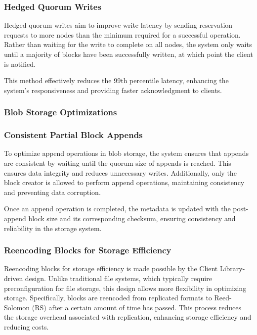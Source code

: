 \subsubsection*{Hedged Quorum Writes}

Hedged quorum writes aim to improve write latency by sending reservation requests to more nodes than the minimum required for a successful operation. Rather than waiting for the write to complete on all nodes, the system only waits until a majority of blocks have been successfully written, at which point the client is notified. 

This method effectively reduces the 99th percentile latency, enhancing the system's responsiveness and providing faster acknowledgment to clients.

\subsubsection{Blob Storage Optimizations}\label{sec:blob_storage_optimization}

\subsubsection*{Consistent Partial Block Appends}

To optimize append operations in blob storage, the system ensures that appends are consistent by waiting until the quorum size of appends is reached. This ensures data integrity and reduces unnecessary writes. Additionally, only the block creator is allowed to perform append operations, maintaining consistency and preventing data corruption.

Once an append operation is completed, the metadata is updated with the post-append block size and its corresponding checksum, ensuring consistency and reliability in the storage system.

\subsubsection*{Reencoding Blocks for Storage Efficiency}

Reencoding blocks for storage efficiency is made possible by the Client Library-driven design. Unlike traditional file systems, which typically require preconfiguration for file storage, this design allows more flexibility in optimizing storage. Specifically, blocks are reencoded from replicated formats to Reed-Solomon (RS) after a certain amount of time has passed. This process reduces the storage overhead associated with replication, enhancing storage efficiency and reducing costs.

